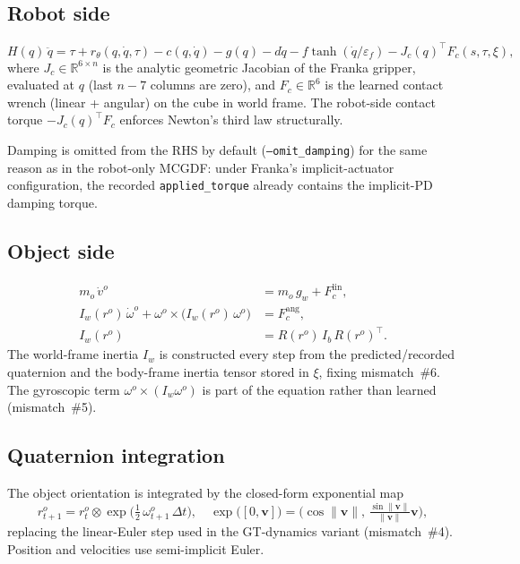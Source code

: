 \documentclass[11pt]{article}
\begin{document}
\subsection{Robot side}
\begin{equation}
  H(q)\,\ddot q
  = \tau + r_\theta(q,\dot q,\tau)
  - c(q,\dot q) - g(q)
  - d\dot q - f\tanh(\dot q/\varepsilon_f)
  - J_c(q)^\top F_c(s,\tau,\xi),
  \label{eq:mcgdf-robot-coupled}
\end{equation}
where $J_c \in \mathbb{R}^{6\times n}$ is the analytic geometric Jacobian of
the Franka gripper, evaluated at $q$ (last $n-7$ columns are zero), and
$F_c \in \mathbb{R}^6$ is the learned contact wrench (linear + angular) on
the cube in world frame. The robot-side contact torque
$-J_c(q)^\top F_c$ enforces Newton's third law structurally.

Damping is omitted from the RHS by default (\texttt{--omit\_damping}) for
the same reason as in the robot-only MCGDF: under Franka's implicit-actuator
configuration, the recorded \texttt{applied\_torque} already contains the
implicit-PD damping torque.

\subsection{Object side}
\begin{align}
  m_o\,\dot v^o
  &= m_o\, g_w + F_c^{\mathrm{lin}},
  \label{eq:mcgdf-object-linear}\\
  I_w(r^o)\,\dot\omega^o + \omega^o\times\bigl(I_w(r^o)\,\omega^o\bigr)
  &= F_c^{\mathrm{ang}},
  \label{eq:mcgdf-object-angular}\\
  I_w(r^o) &= R(r^o)\,I_b\,R(r^o)^\top.
  \label{eq:mcgdf-Iw}
\end{align}
The world-frame inertia $I_w$ is constructed every step from the
predicted/recorded quaternion and the body-frame inertia tensor stored in
$\xi$, fixing mismatch~\#6. The gyroscopic term $\omega^o\times(I_w\omega^o)$
is part of the equation rather than learned (mismatch~\#5).

\subsection{Quaternion integration}
The object orientation is integrated by the closed-form exponential map
\begin{equation}
  r^o_{t+1} = r^o_t \otimes
  \exp\!\bigl(\tfrac{1}{2}\,\omega^o_{t+1}\,\Delta t\bigr),
  \quad
  \exp\!\bigl([0,\mathbf{v}]\bigr) = \bigl(\cos\|\mathbf{v}\|,\,\tfrac{\sin\|\mathbf{v}\|}{\|\mathbf{v}\|}\mathbf{v}\bigr),
  \label{eq:mcgdf-quat-exp}
\end{equation}
replacing the linear-Euler step used in the GT-dynamics variant
(mismatch~\#4).  Position and velocities use semi-implicit Euler.
\end{document}
